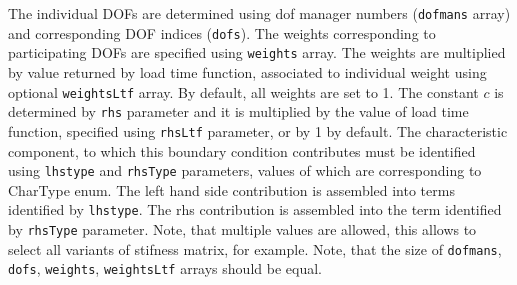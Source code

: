 \documentclass[a4paper]{article}
\newcommand{\param}[1]{\texttt{#1}} %
\begin{document}
\begin{itemize}
The individual DOFs are determined using dof manager numbers (\param{dofmans} array) and corresponding DOF indices (\param{dofs}). The weights corresponding to participating DOFs are specified using \param{weights} array. The weights are multiplied by value returned by load time function, associated to individual weight using optional \param{weightsLtf} array. By default, all weights are set to 1. The constant $c$ is determined by \param{rhs} parameter and it is multiplied by the value of load time function, specified using \param{rhsLtf} parameter, or by 1 by default. The characteristic component, to which this boundary condition contributes must be identified using \param{lhstype} and \param{rhsType} parameters, values of which are corresponding to CharType enum. The left hand side contribution is assembled into terms identified by \param{lhstype}. The rhs contribution is assembled into the term identified by \param{rhsType} parameter. Note, that multiple values are allowed, this allows to select all variants of stifness matrix, for example. Note, that the size of \param{dofmans}, \param{dofs}, \param{weights}, \param{weightsLtf} arrays should be equal.

\end{itemize}
\end{document}
